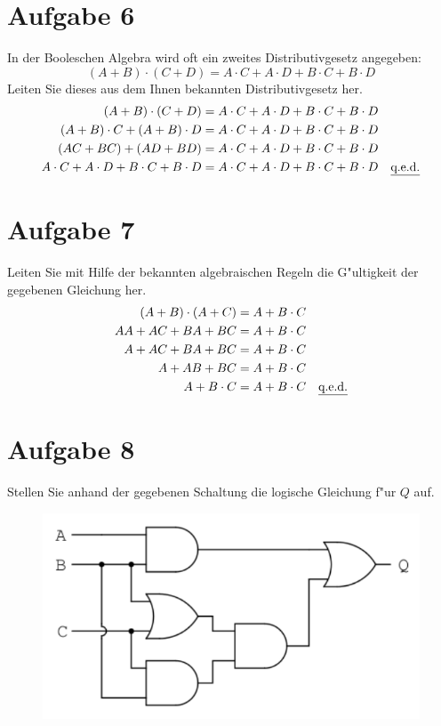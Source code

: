 \documentclass[10pt, oneside]{article}
\begin{document}
\pagebreak
\section{Aufgabe 6}

In der Booleschen Algebra wird oft ein zweites Distributivgesetz angegeben:
\begin{equation*}
    (A + B) \cdot (C + D) = A \cdot C + A \cdot D + B \cdot C + B \cdot D
\end{equation*}
Leiten Sie dieses aus dem Ihnen bekannten Distributivgesetz her.
\begin{align*}
    (A + B) \cdot (C + D)                         &= A \cdot C + A \cdot D + B \cdot C + B \cdot D \\
    (A + B) \cdot C + (A + B) \cdot D             &= A \cdot C + A \cdot D + B \cdot C + B \cdot D \\
    (AC + BC) + (AD + BD)                         &= A \cdot C + A \cdot D + B \cdot C + B \cdot D \\
    A \cdot C + A \cdot D + B \cdot C + B \cdot D &= A \cdot C + A \cdot D + B \cdot C + B \cdot D \quad \text{\underline{q.e.d.}}
\end{align*}

\section{Aufgabe 7}

Leiten Sie mit Hilfe der bekannten algebraischen Regeln die G"ultigkeit der
gegebenen Gleichung her.
\begin{align*}
    (A + B) \cdot (A + C) &= A + B \cdot C \\
    AA + AC + BA + BC &= A + B \cdot C \\
    A + AC + BA + BC &= A + B \cdot C \\
    A + AB + BC &= A + B \cdot C \\
    A + B \cdot C &= A + B \cdot C \quad \text{\underline{q.e.d.}}
\end{align*}

\section{Aufgabe 8}

Stellen Sie anhand der gegebenen Schaltung die logische Gleichung f"ur $Q$ auf.
\begin{figure}[h]
    \centering
    \includegraphics[scale=0.3]{./8.png}
\end{figure}
\end{document}
